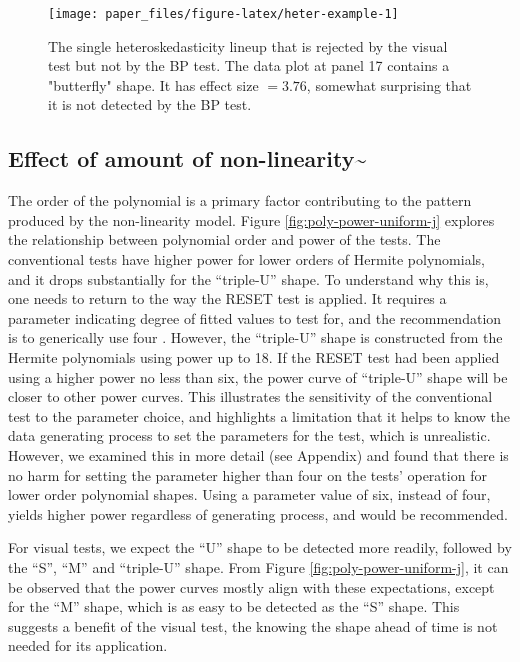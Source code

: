 \documentclass[]{interact}
\theoremstyle{plain}%
\theoremstyle{definition}
\theoremstyle{remark}
\begin{document}
\begin{figure}[t!]

{\centering \texttt{[image: paper\_files/figure-latex/heter-example-1]} 

}

\caption{The single heteroskedasticity lineup that is rejected by the visual test but not by the BP test. The data plot at panel 17 contains a "butterfly" shape. It has effect size $ = 3.76$, somewhat surprising that it is not detected by the BP test.}\label{fig:heter-example}
\end{figure}

\hypertarget{effect-of-amount-of-non-linearity}{%
\subsection{\texorpdfstring{Effect of amount of
non-linearity\textasciitilde{}\label{nonlin-analysis}}{Effect of amount of non-linearity\textasciitilde{}}}\label{effect-of-amount-of-non-linearity}}

The order of the polynomial is a primary factor contributing to the
pattern produced by the non-linearity model. Figure
\ref{fig:poly-power-uniform-j} explores the relationship between
polynomial order and power of the tests. The conventional tests have
higher power for lower orders of Hermite polynomials, and it drops
substantially for the ``triple-U'' shape. To understand why this is, one
needs to return to the way the RESET test is applied. It requires a
parameter indicating degree of fitted values to test for, and the
recommendation is to generically use four \citep{ramsey_tests_1969}.
However, the ``triple-U'' shape is constructed from the Hermite
polynomials using power up to 18. If the RESET test had been applied
using a higher power no less than six, the power curve of ``triple-U''
shape will be closer to other power curves. This illustrates the
sensitivity of the conventional test to the parameter choice, and
highlights a limitation that it helps to know the data generating
process to set the parameters for the test, which is unrealistic.
However, we examined this in more detail (see Appendix) and found that
there is no harm for setting the parameter higher than four on the
tests' operation for lower order polynomial shapes. Using a parameter
value of six, instead of four, yields higher power regardless of
generating process, and would be recommended.

For visual tests, we expect the ``U'' shape to be detected more readily,
followed by the ``S'', ``M'' and ``triple-U'' shape. From Figure
\ref{fig:poly-power-uniform-j}, it can be observed that the power curves
mostly align with these expectations, except for the ``M'' shape, which
is as easy to be detected as the ``S'' shape. This suggests a benefit of
the visual test, the knowing the shape ahead of time is not needed for
its application.
\end{document}

